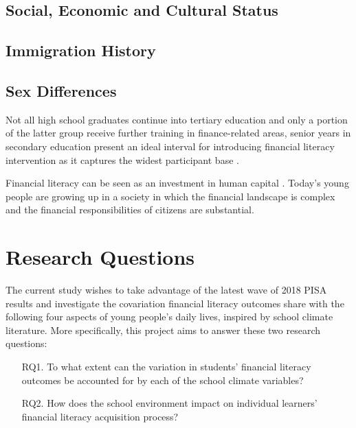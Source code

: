 \documentclass[a4paper,11pt,UKenglish,twoside,openright]{report}\usepackage[]{graphicx}\usepackage[]{color}
\begin{document}
\subsection{Social, Economic and Cultural Status}

\subsection{Immigration History}

\subsection{Sex Differences}


Not all high school graduates continue into tertiary education and only a portion of the latter group receive further training in finance-related areas, senior years in secondary education present an ideal interval for introducing financial literacy intervention as it captures the widest participant base \parencite{walstad:2016}.





Financial literacy can be seen as an investment in human capital \parencite{lusardi:2014}. Today's young people are growing up in a society in which the financial landscape is complex and the financial responsibilities of citizens are substantial.






\section{Research Questions}\label{sec:rq}

The current study wishes to take advantage of the latest wave of 2018 PISA results and investigate the covariation financial literacy outcomes share with the following four aspects of young people's daily lives, inspired by school climate literature. More specifically, this project aims to answer these two research questions:
\begin{enumerate}
    \item[RQ1.] To what extent can the variation in students' financial literacy outcomes be accounted for by each of the school climate variables?
    \item[RQ2.] How does the school environment impact on individual learners' financial literacy acquisition process?
\end{enumerate}
\end{document}
